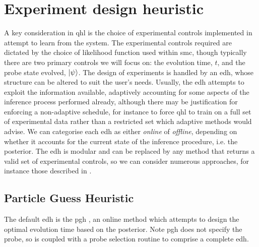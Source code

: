 \section{Experiment design heuristic}
\label{sec:heuristic}
A key consideration in \gls{qhl} is the choice of experimental controls implemented in attempt to learn from the system. 
The experimental controls required are dictated by the choice of \gls{likelihood} function used within \gls{smc}, 
    though typically there are two primary controls we will focus on: 
    the evolution time, $t$, and the \gls{probe} state evolved, $\ket{\psi}$. 
The design of experiments is handled by an \gls{edh}, 
    whose structure can be altered to suit the user's needs. 
Usually, the \gls{edh} attempts to exploit the information available, 
    adaptively accounting for some aspects of the inference process performed already, 
    although there may be justification for enforcing a non-adaptive schedule, 
    for instance to force \gls{qhl} to train on a full set of experimental data 
    rather than a restricted set which adaptive methods would advise.
We can categorise each \gls{edh} as either \emph{online} of \emph{offline},
    depending on whether it accounts for the current state of the inference procedure, i.e. the posterior.
The \gls{edh} is modular and can be replaced by any method that returns a valid set of experimental controls, 
    so we can consider numerous approaches, for instance those described in \cite{hincks2018hamiltonian, fiderer2020neural}.
\par 

\subsection{Particle Guess Heuristic}\label{sec:pgh}
The default \gls{edh} is the \gls{pgh} \cite{Wiebe:2014qhl}, 
    an online method which attempts to design the optimal evolution time based on the posterior.
Note \gls{pgh} does not specify the \gls{probe}, so is coupled with a \gls{probe} selection routine to comprise 
    a complete \gls{edh}.
\par

